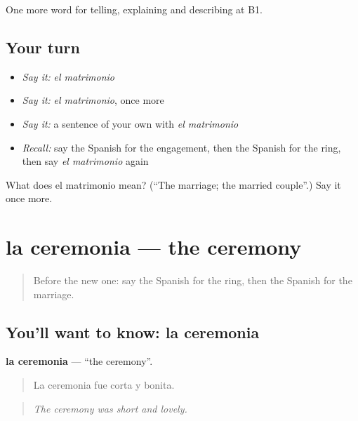 \begin{grammarlens}[title={What you've built}]
One more word for telling, explaining and describing at B1.
\end{grammarlens}

\subsection*{Your turn}
\begin{itemize}
\raggedright
  \item \emph{Say it:} \emph{el matrimonio}
  \item \emph{Say it:} \emph{el matrimonio}, once more
  \item \emph{Say it:} a sentence of your own with \emph{el matrimonio}
  \item \emph{Recall:} say the Spanish for the engagement, then the Spanish for the ring, then say \emph{el matrimonio} again
\end{itemize}

\begin{tcolorbox}[breakable,colback=teal!4,colframe=teal!35!black,title={Before you move on}]
What does el matrimonio mean? (\textquotedblleft{}The marriage; the married couple\textquotedblright{}.) Say it once more.
\end{tcolorbox}
\section[la ceremonia]{la ceremonia — the ceremony}

\label{lesson:ES-C548-ceremonia}



\begin{quote}
Before the new one: say the Spanish for the ring, then the Spanish for the marriage.
\end{quote}

\subsection*{You'll want to know: la ceremonia}
\textbf{la ceremonia} — \textquotedblleft{}the ceremony\textquotedblright{}.

\begin{quote}
La ceremonia fue corta y bonita.
\end{quote}

\begin{quote}
\emph{The ceremony was short and lovely.}
\end{quote}

